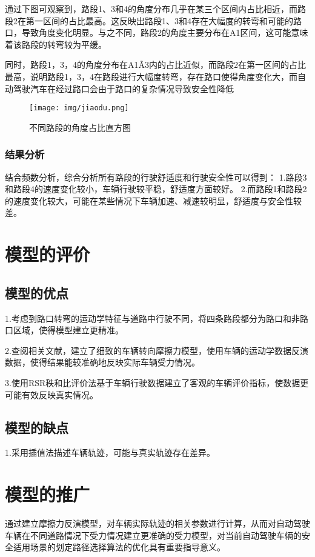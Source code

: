 \documentclass[withoutpreface,bwprint]{cumcmthesis} %
\begin{document}
通过下图可观察到，路段1、3和4的角度分布几乎在某三个区间内占比相近，而路段2在第一区间的占比最高。这反映出路段1、3和4存在大幅度的转弯和可能的路口，导致角度变化明显。与之不同，路段2的角度主要分布在A1区间，这可能意味着该路段的转弯较为平缓。

同时，路段1，3，4的角度分布在A1\~A3内的占比近似，而路段2在第一区间的占比最高，说明路段1，3，4在路段进行大幅度转弯，存在路口使得角度变化大，而自动驾驶汽车在经过路口会由于路口的复杂情况导致安全性降低
\begin{figure}[htbp]
    \centering
    \texttt{[image: img/jiaodu.png]}
     \captionsetup{font=small, position=below}
    \caption{不同路段的角度占比直方图}
\end{figure}
\subsubsection{结果分析}
结合频数分析，综合分析所有路段的行驶舒适度和行驶安全性可以得到：
1.路段3和路段4的速度变化较小，车辆行驶较平稳，舒适度方面较好。
2.而路段1和路段2的速度变化较大，可能在某些情况下车辆加速、减速较明显，舒适度与安全性较差。



\section{模型的评价}
\subsection{模型的优点}

1.考虑到路口转弯的运动学特征与道路中行驶不同，将四条路段都分为路口和非路口区域，使得模型建立更精准。

2.查阅相关文献，建立了细致的车辆转向摩擦力模型，使用车辆的运动学数据反演数据，使得结果能较准确地反映实际车辆受力情况。

3.使用RSR秩和比评价法基于车辆行驶数据建立了客观的车辆评价指标，使数据更可能有效反映真实情况。

\subsection{模型的缺点}
1.采用插值法描述车辆轨迹，可能与真实轨迹存在差异。

\section{模型的推广}

通过建立摩擦力反演模型，对车辆实际轨迹的相关参数进行计算，从而对自动驾驶车辆在不同道路情况下受力情况建立更准确的受力模型，对当前自动驾驶车辆的安全适用场景的划定路径选择算法的优化具有重要指导意义。
\end{document}
